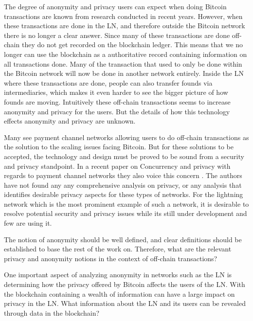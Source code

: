 The degree of anonymity and privacy users can expect when doing Bitcoin transactions are known from research conducted in recent years.
However, when these transactions are done in the LN, and therefore outside the Bitcoin network there is no longer a clear answer. Since many of these transactions are done off-chain they do not get recorded on the blockchain ledger. This means that we no longer can use the blockchain as a authoritative record containing information on all transactions done. Many of the transaction that used to only be done within the Bitcoin network will now be done in another network entirely. Inside the LN where these transactions are done, people can also transfer founds via intermediaries, which makes it even harder to see the bigger picture of how founds are moving.
Intuitively these off-chain transactions seems to increase anonymity and privacy for the users.
But the details of how this technology effects anonymity and privacy are unknown.


Many see payment channel networks allowing users to do off-chain transactions as the solution to the scaling issues facing Bitcoin.
But for these solutions to be accepted, the technology and design must be proved to be sound from a security and privacy standpoint. 
In a recent paper on Concurrency and privacy with regards to payment channel networks they also voice this concern \cite{malavolta2017concurrency}. The authors have not found any any comprehensive analysis on privacy, or any analysis that identifies desirable privacy aspects for these types of networks. For the lightning network which is the most prominent example of such a network, it is desirable to resolve potential security and privacy issues while its still under development and few are using it. 




The notion of anonymity should be well defined, and clear definitions should be established to base the rest of the work on.
Therefore, what are the relevant privacy and anonymity notions in the context of off-chain transactions?

One important aspect of analyzing anonymity in networks such as the LN is determining how the privacy offered by Bitcoin affects the users of the LN. With the blockchain containing a wealth of information can have a large impact on privacy in the LN. What information about the LN and its users can be revealed through data in the blockchain? 

